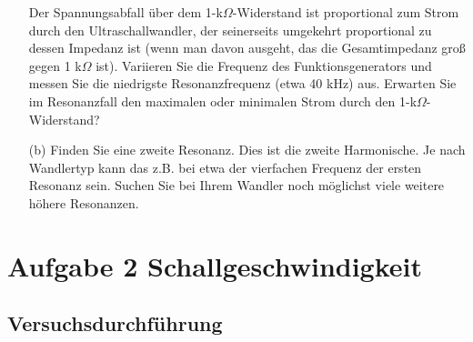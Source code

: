 \documentclass[12pt]{scrartcl}
\begin{document}
\begin{itemize}
\begin{figure}[htbp]
  \label{fig:impedanz}
\end{figure}
Der Spannungsabfall über dem 1-k$\Omega$-Widerstand ist proportional zum Strom durch den Ultraschallwandler, der seinerseits umgekehrt proportional zu dessen Impedanz ist (wenn man davon ausgeht, das die Gesamtimpedanz groß gegen 1 k$\Omega$ ist).
Variieren Sie die Frequenz des Funktionsgenerators und messen Sie die niedrigste Resonanzfrequenz (etwa 40 kHz)
aus. Erwarten Sie im Resonanzfall den maximalen oder minimalen Strom durch den 1-k$\Omega$-Widerstand? 
\item[(b)]
Finden Sie eine zweite Resonanz. Dies ist die zweite Harmonische. Je nach Wandlertyp kann das z.B. bei etwa der vierfachen Frequenz der ersten Resonanz sein. Suchen Sie bei Ihrem Wandler noch möglichst viele weitere höhere
Resonanzen.
\end{itemize}
\section{Aufgabe 2 Schallgeschwindigkeit}
\subsection{Versuchsdurchführung}
\end{document}

